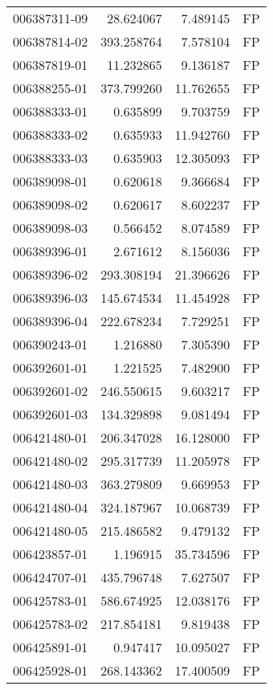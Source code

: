 \begin{tabular}{lrrl}
006387311-09 &   28.624067 &     7.489145 &   FP \\
006387814-02 &  393.258764 &     7.578104 &   FP \\
006387819-01 &   11.232865 &     9.136187 &   FP \\
006388255-01 &  373.799260 &    11.762655 &   FP \\
006388333-01 &    0.635899 &     9.703759 &   FP \\
006388333-02 &    0.635933 &    11.942760 &   FP \\
006388333-03 &    0.635903 &    12.305093 &   FP \\
006389098-01 &    0.620618 &     9.366684 &   FP \\
006389098-02 &    0.620617 &     8.602237 &   FP \\
006389098-03 &    0.566452 &     8.074589 &   FP \\
006389396-01 &    2.671612 &     8.156036 &   FP \\
006389396-02 &  293.308194 &    21.396626 &   FP \\
006389396-03 &  145.674534 &    11.454928 &   FP \\
006389396-04 &  222.678234 &     7.729251 &   FP \\
006390243-01 &    1.216880 &     7.305390 &   FP \\
006392601-01 &    1.221525 &     7.482900 &   FP \\
006392601-02 &  246.550615 &     9.603217 &   FP \\
006392601-03 &  134.329898 &     9.081494 &   FP \\
006421480-01 &  206.347028 &    16.128000 &   FP \\
006421480-02 &  295.317739 &    11.205978 &   FP \\
006421480-03 &  363.279809 &     9.669953 &   FP \\
006421480-04 &  324.187967 &    10.068739 &   FP \\
006421480-05 &  215.486582 &     9.479132 &   FP \\
006423857-01 &    1.196915 &    35.734596 &   FP \\
006424707-01 &  435.796748 &     7.627507 &   FP \\
006425783-01 &  586.674925 &    12.038176 &   FP \\
006425783-02 &  217.854181 &     9.819438 &   FP \\
006425891-01 &    0.947417 &    10.095027 &   FP \\
006425928-01 &  268.143362 &    17.400509 &   FP \\

\end{tabular}

